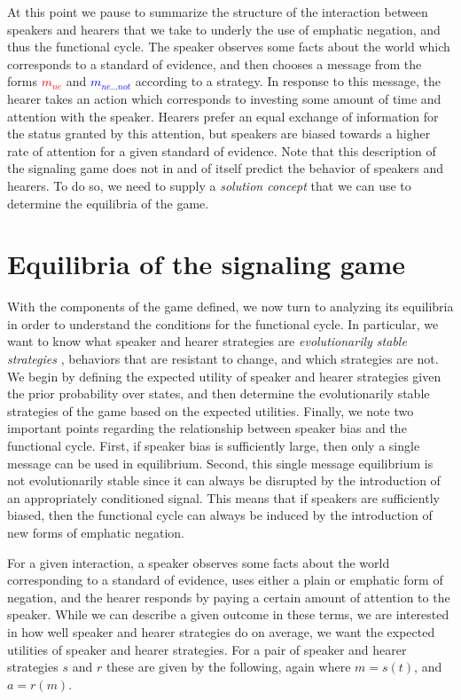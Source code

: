 \documentclass[linguex]{sp}
\theoremstyle{definition} \newtheorem{definition}{Definition}
\begin{document}
At this point we pause to summarize the structure of the interaction between speakers and hearers that we take to underly the use of emphatic negation, and thus the functional cycle. The speaker observes some facts about the world which corresponds to a standard of evidence, and then chooses a message from the forms \emph{\textcolor{red}{$m_{ne}$}} and \emph{\textcolor{blue}{$m_{ne...not}$}} according to a strategy. In response to this message, the hearer takes an action which corresponds to investing some amount of time and attention with the speaker. Hearers prefer an equal exchange of information for the status granted by this attention, but speakers are biased towards a higher rate of attention for a given standard of evidence. Note that this description of the signaling game does not in and of itself predict the behavior of speakers and hearers. To do so, we need to supply a \emph{solution concept} that we can use to determine the equilibria of the game.


\section{Equilibria of the signaling game}
\label{Equilibrium}

With the components of the game defined, we now turn to analyzing its equilibria in order to understand the conditions for the functional cycle. In particular, we want to know what speaker and hearer strategies are \emph{evolutionarily stable strategies} \citep{maynard-smith1982}, behaviors that are resistant to change, and which strategies are not. We begin by defining the expected utility of speaker and hearer strategies given the prior probability over states, and then determine the evolutionarily stable strategies of the game based on the expected utilities. Finally, we note two important points regarding the relationship between speaker bias and the functional cycle.  First, if speaker bias is sufficiently large, then only a single message can be used in equilibrium. Second, this single message equilibrium is not evolutionarily stable since it can always be disrupted by the introduction of an appropriately conditioned signal. This means that if speakers are sufficiently biased, then the functional cycle can always be induced by the introduction of new forms of emphatic negation.

For a given interaction, a speaker observes some facts about the world corresponding to a standard of evidence, uses either a plain or emphatic form of negation, and the hearer responds by paying a certain amount of attention to the speaker. While we can describe a given outcome in these terms, we are  interested in how well speaker and hearer strategies do on average, we want the expected utilities of speaker and hearer strategies. For a pair of speaker and hearer strategies $s$ and $r$ these are given by the following, again where $m = s(t)$, and $a = r(m)$.
\end{document}
